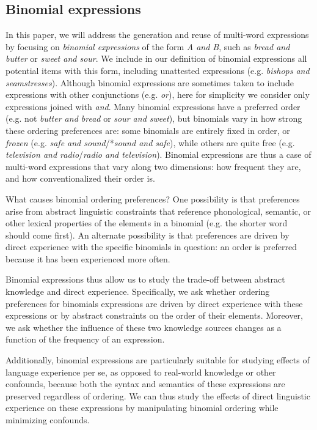 \documentclass[authoryear]{elsarticle}
\begin{document}
\subsection{Binomial expressions}
In this paper, we will address the generation and reuse of multi-word expressions by focusing on \emph{binomial expressions} of the form \emph{A and B}, such as \emph{bread and butter} or \emph{sweet and sour}. We include in our definition of binomial expressions all potential items with this form, including unattested expressions (e.g. \emph{bishops and seamstresses}). Although binomial expressions are sometimes taken to include expressions with other conjunctions (e.g. \emph{or}), here for simplicity we consider only expressions joined with \emph{and}. Many binomial expressions have a preferred order (e.g. not \emph{butter and bread} or \emph{sour and sweet}), but binomials vary in how strong these ordering preferences are: some binomials are entirely fixed in order, or \emph{frozen} (e.g. \emph{safe and sound}/*\emph{sound and safe}), while others are quite free (e.g. \emph{television and radio}/\emph{radio and television}). Binomial expressions are thus a case of multi-word expressions that vary along two dimensions: how frequent they are, and how conventionalized their order is.

What causes binomial ordering preferences? One possibility is that preferences arise from abstract linguistic constraints that reference phonological, semantic, or other lexical properties of the elements in a binomial (e.g. the shorter word should come first). An alternate possibility is that preferences are driven by direct experience with the specific binomials in question: an order is preferred because it has been experienced more often.

Binomial expressions thus allow us to study the trade-off between abstract knowledge and direct experience. Specifically, we ask whether ordering preferences for binomials expressions are driven by direct experience with these expressions or by abstract constraints on the order of their elements. Moreover, we ask whether the influence of these two knowledge sources changes as a function of the frequency of an expression.

Additionally, binomial expressions are particularly suitable for studying effects of language experience per se, as opposed to real-world knowledge or other confounds, because both the syntax and semantics of these expressions are preserved regardless of ordering. We can thus study the effects of direct linguistic experience on these expressions by manipulating binomial ordering while minimizing confounds.
\end{document}
